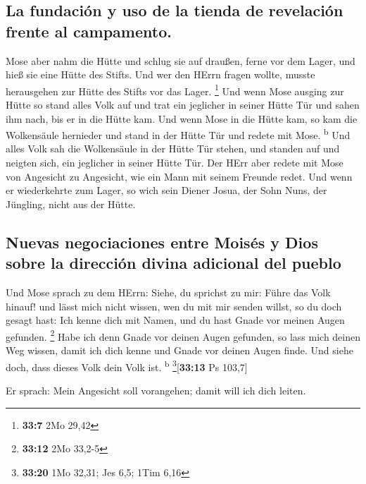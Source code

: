 \hypertarget{la-fundaciuxf3n-y-uso-de-la-tienda-de-revelaciuxf3n-frente-al-campamento.}{%
\subsection{La fundación y uso de la tienda de revelación frente al
campamento.}\label{la-fundaciuxf3n-y-uso-de-la-tienda-de-revelaciuxf3n-frente-al-campamento.}}

 Mose aber nahm die Hütte und schlug sie auf draußen,
ferne vor dem Lager, und hieß sie eine Hütte des Stifts. Und wer den
HErrn fragen wollte, musste herausgehen zur Hütte des Stifts vor das
Lager. \footnote{\textbf{33:7} 2Mo 29,42}  Und wenn Mose
ausging zur Hütte so stand alles Volk auf und trat ein jeglicher in
seiner Hütte Tür und sahen ihm nach, bis er in die Hütte kam.
 Und wenn Mose in die Hütte kam, so kam die Wolkensäule
hernieder und stand in der Hütte Tür und redete mit Mose.
\textsuperscript{b}  Und alles Volk sah die Wolkensäule
in der Hütte Tür stehen, und standen auf und neigten sich, ein jeglicher
in seiner Hütte Tür.  Der HErr aber redete mit Mose von
Angesicht zu Angesicht, wie ein Mann mit seinem Freunde redet. Und wenn
er wiederkehrte zum Lager, so wich sein Diener Josua, der Sohn Nuns, der
Jüngling, nicht aus der Hütte.

\hypertarget{nuevas-negociaciones-entre-moisuxe9s-y-dios-sobre-la-direcciuxf3n-divina-adicional-del-pueblo}{%
\subsection{Nuevas negociaciones entre Moisés y Dios sobre la dirección
divina adicional del
pueblo}\label{nuevas-negociaciones-entre-moisuxe9s-y-dios-sobre-la-direcciuxf3n-divina-adicional-del-pueblo}}

 Und Mose sprach zu dem HErrn: Siehe, du sprichst zu mir:
Führe das Volk hinauf! und lässt mich nicht wissen, wen du mit mir
senden willst, so du doch gesagt hast: Ich kenne dich mit Namen, und du
hast Gnade vor meinen Augen gefunden. \footnote{\textbf{33:12} 2Mo
  33,2-5}  Habe ich denn Gnade vor deinen Augen gefunden,
so lass mich deinen Weg wissen, damit ich dich kenne und Gnade vor
deinen Augen finde. Und siehe doch, dass dieses Volk dein Volk ist.
\textsuperscript{b} \footnote{\textbf{33:20} 1Mo 32,31; Jes 6,5; 1Tim
  6,16}{[}\textbf{33:13} Ps 103,7{]}

 Er sprach: Mein Angesicht soll vorangehen; damit will
ich dich leiten.


